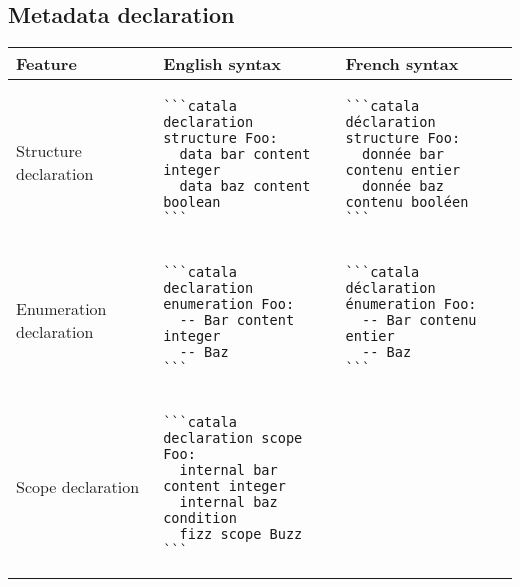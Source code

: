 \documentclass[a3paper,landscape]{article}
\begin{document}
\begin{multicols*}{2}
  \section*{Metadata declaration}
  \begin{tabular}{p{}p{}p{}}
    \toprule
    Feature                       & English syntax & French syntax \\\midrule
    Structure declaration         &
    \vspace*{-1.75em}
    \begin{verbatim}
```catala
declaration structure Foo:
  data bar content integer
  data baz content boolean
```
\end{verbatim}
    \vspace*{-1.75em}
                                  &
    \vspace*{-1.75em}
    \begin{verbatim}
```catala
déclaration structure Foo:
  donnée bar contenu entier
  donnée baz contenu booléen
```
\end{verbatim}
    \vspace*{-1.75em}
    \\
    Enumeration declaration       &
    \vspace*{-1.75em}
    \begin{verbatim}
```catala
declaration enumeration Foo:
  -- Bar content integer
  -- Baz
```
\end{verbatim}
    \vspace*{-1.75em}
                                  &
    \vspace*{-1.75em}
    \begin{verbatim}
```catala
déclaration énumeration Foo:
  -- Bar contenu entier
  -- Baz
```
\end{verbatim}
    \vspace*{-1.75em}                                              \\
    Scope declaration             &
    \vspace*{-1.75em}
    \begin{verbatim}
```catala
declaration scope Foo:
  internal bar content integer
  internal baz condition
  fizz scope Buzz
```
\end{verbatim}
    \vspace*{-1.75em}
                                  &
    \vspace*{-1.75em}
    \begin{verbatim}

\end{verbatim}
\end{tabular}
\end{multicols*}
\end{document}
